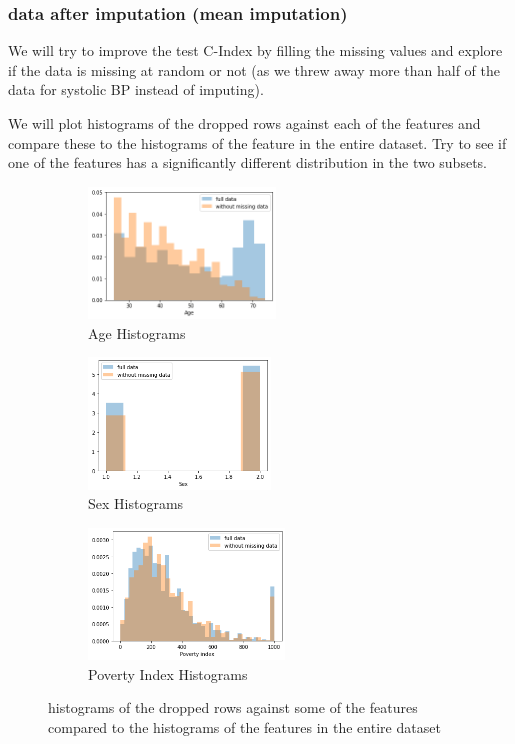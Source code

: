 \documentclass[5 pt]{article}
\begin{document}
\subsubsection{data after imputation (mean imputation)}

We will try to improve the test C-Index by filling the missing values and explore if the data is missing at random or not (as we threw away more than half of the data for systolic BP instead of imputing).

We will plot histograms of the dropped rows against each of the features and compare these to the histograms of the feature in the entire dataset. Try to see if one of the features has a significantly different distribution in the two subsets.

 \begin{figure}[h]
	\begin{subfigure}{0.5\textwidth}
		\includegraphics[width=1\linewidth, height=3.5cm]{age.png} 
		\caption{Age Histograms}
	\end{subfigure}
	\begin{subfigure}{0.5\textwidth}
		\includegraphics[width=1\linewidth, height=3.5cm]{sex.png}
		\caption{Sex Histograms}
	\end{subfigure}
	\begin{subfigure}{0.5\textwidth}
		\includegraphics[width=1\linewidth, height=3.5cm]{pov.png}
		\caption{Poverty Index Histograms}
	\end{subfigure}
\caption{histograms of the dropped rows against some of the features compared to the histograms of the features in the entire dataset}
\label{fig:image2}
\end{figure}
\end{document}
